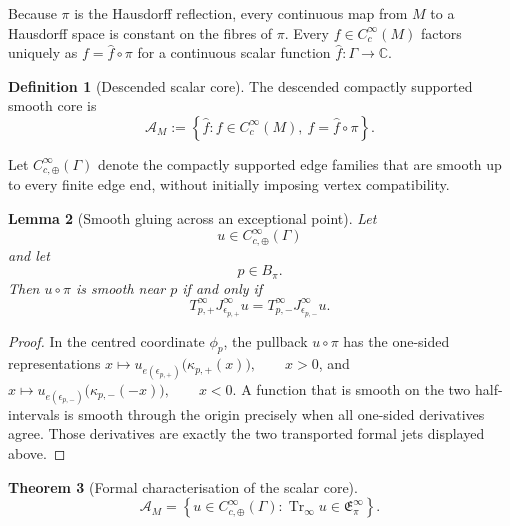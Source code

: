 \documentclass[11pt]{article}
\theoremstyle{plain}
\newtheorem{theorem}{Theorem}[section]
\newtheorem{lemma}[theorem]{Lemma}
\theoremstyle{definition}
\newtheorem{definition}[theorem]{Definition}
\begin{document}
Because \(\pi\) is the Hausdorff reflection, every continuous map from
\(M\) to a Hausdorff space is constant on the fibres of \(\pi\).
Every \(f\in C_c^\infty(M)\) factors uniquely as \(f=\widehat f\circ\pi\) for a continuous scalar function
\(\widehat f:\Gamma\longrightarrow\mathbb C\).

\begin{definition}[Descended scalar core]
\label{def:descended-scalar-core}
The descended compactly supported smooth core is
\[
  \mathscr A_M
  :=
  \left\{
    \widehat f:
    f\in C_c^\infty(M),\
    f=\widehat f\circ\pi
  \right\}.
\]
\end{definition}

Let \(C_{c,\oplus}^\infty(\Gamma)\) denote the compactly supported edge families that are smooth up to
every finite edge end, without initially imposing vertex
compatibility.

\begin{lemma}[Smooth gluing across an exceptional point]
\label{lem:graph-smooth-gluing}
Let
\[
  u\in C_{c,\oplus}^\infty(\Gamma)
\]
and let
\[
  p\in B_\pi.
\]
Then \(u\circ\pi\) is smooth near \(p\) if and only if
\[
  T_{p,+}^\infty
  J_{\epsilon_{p,+}}^\infty u
  =
  T_{p,-}^\infty
  J_{\epsilon_{p,-}}^\infty u.
\]
\end{lemma}

\begin{proof}
In the centred coordinate \(\phi_p\), the pullback \(u\circ\pi\) has
the one-sided representations
\(x\longmapsto u_{e(\epsilon_{p,+})} \bigl( \kappa_{p,+}(x) \bigr), \qquad x>0\),
and
\(x\longmapsto u_{e(\epsilon_{p,-})} \bigl( \kappa_{p,-}(-x) \bigr), \qquad x<0\).
A function that is smooth on the two half-intervals is smooth through
the origin precisely when all one-sided derivatives agree. Those
derivatives are exactly the two transported formal jets displayed
above.
\end{proof}

\begin{theorem}[Formal characterisation of the scalar core]
\label{thm:formal-characterization-scalar-core}
\[
  \boxed{
  \mathscr A_M
  =
  \left\{
    u\in C_{c,\oplus}^\infty(\Gamma):
    \operatorname{Tr}_\infty u
    \in
    \mathfrak E_\pi^\infty
  \right\}.
  }
\]
\end{theorem}
\end{document}
